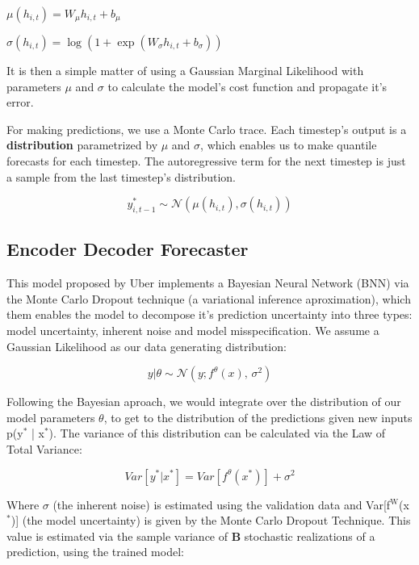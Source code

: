 \documentclass[11pt]{article}
\begin{document}
\begin{center}
\(\mu(h_{i,t}) = W_{\mu}h_{i,t} + b_{\mu}\) 

\(\sigma(h_{i,t}) = \log(1 + \exp(W_{\sigma}h_{i,t}+ b_{\sigma}))\) 
\end{center}
It is then a simple matter of using a Gaussian Marginal Likelihood with parameters \(\mu\) and \(\sigma\) to 
calculate the model's cost function and propagate it's error.

For making predictions, we use a Monte Carlo trace. Each timestep's output is a \textbf{\textbf{distribution}} parametrized by \(\mu\) and \(\sigma\), which enables us to make quantile forecasts for each timestep.
The autoregressive term for the next timestep is just a sample from the last timestep's distribution.

\[ y^*_{i,t-1}  \sim \mathcal{N}(\mu(h_{i,t}),\sigma(h_{i,t})) \]



\subsection{Encoder Decoder Forecaster \cite{ubertime}}
\label{sec:orgc1cd35d}
This model proposed by Uber implements a Bayesian Neural Network (BNN) via the Monte Carlo Dropout technique (a variational inference aproximation),
which them enables the model to decompose it's prediction uncertainty into three types:
model uncertainty, inherent noise and model misspecification. We assume a Gaussian Likelihood as
our data generating distribution: 

\begin{equation}
y| \theta \sim \mathcal{N}(y;f^{\theta}(x),\,\sigma^2)
\end{equation}

Following the Bayesian aproach, we would integrate over the distribution of
our model parameters \(\theta\), to get to the distribution of the predictions given new inputs 
p(y\(^{\text{*}}\) | x\(^{\text{*}}\)). The variance of this distribution can be calculated via the Law of Total Variance:

\begin{equation}
Var[y^* | x^*] = Var[f^{\theta}(x^*)] + \sigma^2  
\end{equation}

Where \(\sigma\) (the inherent noise) is estimated using the validation data and Var[f\(^{\text{W}}\)(x\(^{\text{*}}\))] (the model uncertainty)
is given by the Monte Carlo Dropout Technique. This value is estimated via the sample variance 
of \textbf{\textbf{B}} stochastic realizations of a prediction, using the trained model: 
\end{document}
